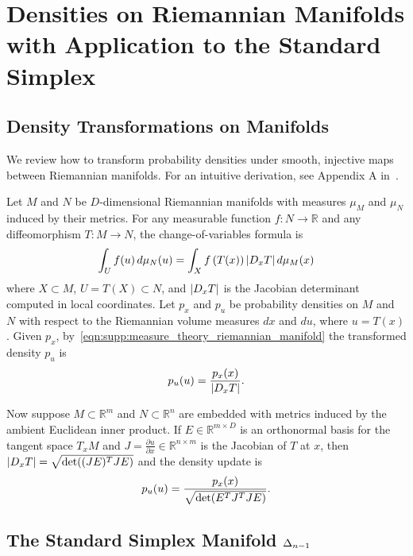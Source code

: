 \section{Densities on Riemannian Manifolds with Application to the Standard Simplex}\label{sec:supp:riemannian_manifolds}

\subsection{Density Transformations on Manifolds}\label{sec:supp:xform_generic}

We review how to transform probability densities under smooth, injective maps between Riemannian manifolds.
For an intuitive derivation, see Appendix A in~\citep{rezende_normalizing_2020}.

Let $M$ and $N$ be $D$-dimensional Riemannian manifolds with measures $\mu_M$ and $\mu_N$ induced by their metrics.
For any measurable function $f\colon N\to\mathbb{R}$ and any diffeomorphism $T\colon M\to N$, the change-of-variables formula is
\begin{align}\label{eqn:supp:measure_theory_riemannian_manifold}
    \int_U f(u) \, d\mu_N(u) = \int_X f\left(T(x)\right) \AbsDet{D_x T} \, d\mu_M(x)
\end{align}
where $X\subset M$, $U=T(X)\subset N$, and $\left\lvert D_x T\right\rvert$ is the Jacobian determinant computed in local coordinates.
Let $p_x$ and $p_u$ be probability densities on $M$ and $N$ with respect to the Riemannian volume measures $dx$ and $du$, where $u = T(x)$.
Given $p_x$, by~\eqref{eqn:supp:measure_theory_riemannian_manifold} the transformed density $p_u$ is
\begin{align}\label{eqn:supp:xform_density_manifold}
    p_{u}(u) = \frac{p_x(x)}{\left\lvert D_x T\right\rvert}.
\end{align}

Now suppose $M \subset \mathbb{R}^{m}$ and $N \subset \mathbb{R}^{n}$ are embedded with metrics induced by the ambient Euclidean inner product.
If $E \in \mathbb{R}^{m\times D}$ is an orthonormal basis for the tangent space $T_x M$ and $J=\frac{\partial u}{\partial x}\in\mathbb{R}^{n\times m}$ is the Jacobian of $T$ at $x$, then $\AbsDet{D_x T} = \sqrt{\Det{(JE)^T JE}}$ and the density update is
\begin{align}\label{eqn:supp:xform_density_embedded}
    p_{u}(u) = \frac{p_x(x)}{\sqrt{\Det{E^T J^T J E}}}.
\end{align}

\subsection{The Standard Simplex Manifold \texorpdfstring{$\Delta_{n-1}$}{DeltaNMinusOne}}\label{sec:supp:simplex_manifold}


